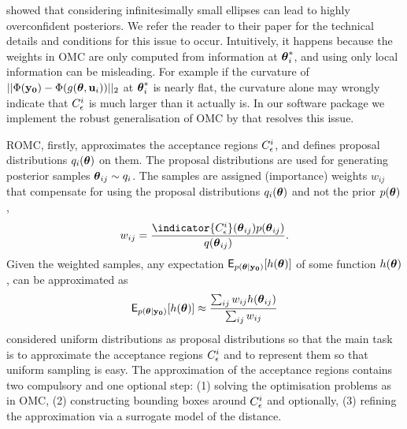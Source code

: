 \citet{Ikonomov2019} showed that considering infinitesimally small
ellipses can lead to highly overconfident posteriors. We refer the
reader to their paper for the technical details and conditions for
this issue to occur. Intuitively, it happens because the weights in
OMC are only computed from information at \(\boldsymbol{\theta}_i^*\), and using
only local information can be misleading. For example if the curvature
of \(||\Phi(\mathbf{y_0})-\Phi(g(\boldsymbol{\theta}, \mathbf{u}_i))||_2\) at
\(\boldsymbol{\theta}_i^*\) is nearly flat, the curvature alone may wrongly
indicate that \(C^i_{\epsilon}\) is much larger than it actually is. In
our software package we implement the robust generalisation of OMC by
\citet{Ikonomov2019} that resolves this issue.

ROMC, firstly, approximates the acceptance regions \(C^i_{\epsilon}\),
and defines proposal distributions \(q_i(\boldsymbol{\theta})\) on them. The
proposal distributions are used for generating posterior samples
\(\boldsymbol{\theta}_{ij} \sim q_i\). The samples are assigned (importance)
weights \(w_{ij}\) that compensate for using the proposal
distributions \(q_i(\boldsymbol{\theta})\) and not the prior \(p(\boldsymbol{\theta})\),
\begin{equation}
  w_{ij} = \frac{\indicator{\accregioni}(\thetab_{ij}) p(\thetab_{ij})}{q(\thetab_{ij})}.
  \label{eq:sampling}
\end{equation}
Given the weighted samples, any expectation
\(\mathsf{E}_{p(\boldsymbol{\theta}|\mathbf{y_0})}[h(\boldsymbol{\theta})]\) of some function \(h(\boldsymbol{\theta})\), can be approximated as
\begin{equation} \label{eq:expectation}
  \mathsf{E}_{p(\boldsymbol{\theta}|\mathbf{y_0})}[h(\boldsymbol{\theta})] \approx \frac{\sum_{ij} w_{ij} h(\boldsymbol{\theta}_{ij})}{\sum_{ij} w_{ij}}
\end{equation}
\citet{Ikonomov2019} considered uniform distributions as proposal
distributions so that the main task is to approximate the acceptance
regions \(C^i_{\epsilon}\) and to represent them so that uniform sampling
is easy. The approximation of the acceptance regions contains two
compulsory and one optional step: (1) solving the optimisation
problems as in OMC, (2) constructing bounding boxes around
\(C^i_{\epsilon}\) and optionally, (3) refining the approximation via a
surrogate model of the distance.

